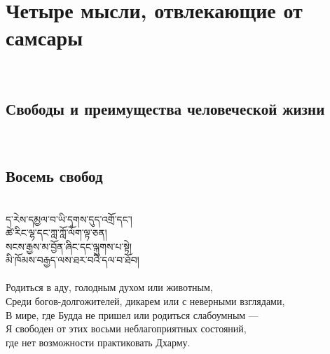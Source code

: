 \newpage
\section{Четыре мысли, отвлекающие от самсары}
\\
\subsection{Свободы и преимущества человеческой жизни}
\\
\subsection*{Восемь свобод}
\\
\ti
ད་རེས་དམྱལ་བ་ཡི་དྭགས་དུད་འགྲོ་དང༌།\\
ཚེ་རིང་ལྷ་དང་ཀླ་ཀློ་ལོག་ལྟ་ཅན།\\
སངས་རྒྱས་མ་བྱོན་ཞིང་དང་ལྐུགས་པ་སྟེ།\\
མི་ཁོམས་བརྒྱད་ལས་ཐར་བའི་དལ་བ་ཐོབ།\\
\\
\ru
Родиться в аду, голодным духом или животным,\\
Среди богов-долгожителей, дикарем или с неверными взглядами,\\
В мире, где Будда не пришел или родиться слабоумным —\\
Я свободен от этих восьми неблагоприятных состояний,\\
\indent где нет возможности практиковать Дхарму.\\

\newpage
